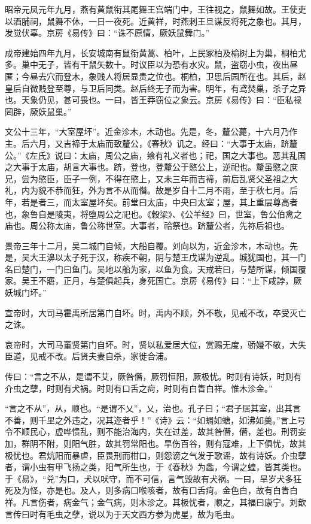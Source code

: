 \documentclass[12pt,UTF8]{ctexbook}
\begin{document}
昭帝元凤元年九月，燕有黄鼠衔其尾舞王宫端门中，王往视之，鼠舞如故。王使吏以酒脯祠，鼠舞不休，一日一夜死。近黄祥，时燕剌王旦谋反将死之象也。其月，发觉伏辜。京房《易传》曰：“诛不原情，厥妖鼠舞门。”



成帝建始四年九月，长安城南有鼠衔黄蒿、柏叶，上民冢柏及榆树上为巢，桐柏尤多。巢中无子，皆有干鼠矢数十。时议臣以为恐有水灾。鼠，盗窃小虫，夜出昼匿；今昼去穴而登木，象贱人将居显贵之位也。桐柏，卫思后园所在也。其后，赵皇后自微贱登至尊，与卫后同类。赵后终无子而为害。明年，有鸢焚巢，杀子之异也。天象仍见，甚可畏也。一曰，皆王莽窃位之象云。京房《易传》曰：“臣私禄罔辟，厥妖鼠巢。”



文公十三年，“大室屋坏”。近金沴木，木动也。先是，冬，釐公薨，十六月乃作主。后六月，又吉褅于太庙而致釐公，《春秋》讥之。经曰：“大事于太庙，跻釐公。”《左氏》说曰：太庙，周公之庙，飨有礼义者也；祀，国之大事也。恶其乱国之大事于太庙，胡言大事也。跻，登也，登釐公于愍公上，逆祀也。釐虽愍之庶兄，尝为愍臣，臣子一例，不得在愍上，又未三年而吉褅，前后乱贤父圣祖之大礼，内为貌不恭而狂，外为言不从而僭。故是岁自十二月不雨，至于秋七月。后年，若是者三，而太室屋坏矣。前堂曰太庙，中央曰太室；屋，其上重层尊高者也，象鲁自是陵夷，将堕周公之祀也。《穀梁》、《公羊经》曰，世室，鲁公伯禽之庙也。周公称太庙，鲁公称世室。大事者，祫祭也。跻釐公者，先祢后祖也。



景帝三年十二月，吴二城门自倾，大船自覆。刘向以为，近金沴木，木动也。先是，吴大王濞以太子死于汉，称疾不朝，阴与楚王戊谋为逆乱。城犹国也，其一门名曰楚门，一门曰鱼门。吴地以船为家，以鱼为食。天戒若曰，与楚所谋，倾国覆家。吴王不寤，正月，与楚俱起兵，身死国亡。京房《易传》曰：“上下咸誖，厥妖城门坏。”



宣帝时，大司马霍禹所居第门自坏。时，禹内不顺，外不敬，见戒不改，卒受灭亡之诛。



哀帝时，大司马董贤第门自坏。时，贤以私爱居大位，赏赐无度，骄嫚不敬，大失臣道，见戒不改。后贤夫妻自杀，家徙合浦。



传曰：“言之不从，是谓不艾，厥咎僭，厥罚恒阳，厥极忧。时则有诗妖，时则有介虫之孽，时则有犬祸。时则有口舌之疴，时则有白眚白祥。惟木沴金。”



“言之不从”，从，顺也。“是谓不乂”，乂，治也。孔子曰；“君子居其室，出其言不善，则千里之外违之，况其迩者乎！”《诗》云：“如蜩如螗，如沸如羹。”言上号令不顺民心，虚哗愦乱，则不能治海内，失在过差，故其咎僭，僭，差也。刑罚妄加，群阴不附，则阳气胜，故其罚常阳也。旱伤百谷，则有寇难，上下俱忧，故其极忧也。君炕阳而暴虐，臣畏刑而柑口，则怨谤之气发于歌谣，故有诗妖。介虫孽者，谓小虫有甲飞扬之类，阳气所生也，于《春秋》为螽，今谓之蝗，皆其类也。于《易》，“兑”为口，犬以吠守，而不可信，言气毁故有犬祸。一曰，旱岁犬多狂死及为怪，亦是也。及人，则多病口喉咳者，故有口舌疴。金色白，故有白眚白祥。凡言伤者，病金气；金气病，则木沴之。其极忧者，顺之，其福曰康宁。刘歆言传曰时有毛虫之孽，说以为于天文西方参为虎星，故为毛虫。
\end{document}
